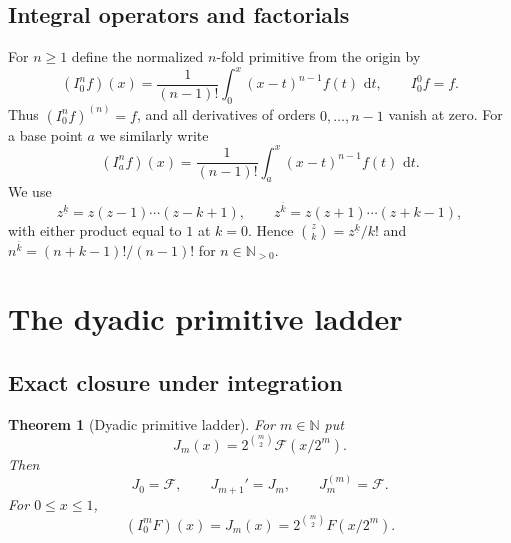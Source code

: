 \documentclass[11pt,oneside]{article}
\numberwithin{equation}{section}
\newtheorem{theorem}{Theorem}[section]
\theoremstyle{definition}
\theoremstyle{remark}
\newcommand{\N}{\mathbb N}
\newcommand{\dd}{\,\mathrm d}
\newcommand{\fall}[2]{#1^{\underline{#2}}}
\newcommand{\rise}[2]{#1^{\overline{#2}}}
\begin{document}
\subsection{Integral operators and factorials}

For $n\ge1$ define the normalized $n$-fold primitive from the origin by
\begin{equation}
 (I_0^nf)(x)=\frac1{(n-1)!}\int_0^x(x-t)^{n-1}f(t)\,\dd t,
 \qquad I_0^0f=f.                                             \label{eq:I0n}
\end{equation}
Thus $(I_0^nf)^{(n)}=f$, and all derivatives of orders $0,\ldots,n-1$ vanish at zero.
For a base point $a$ we similarly write
\begin{equation}
 (I_a^nf)(x)=\frac1{(n-1)!}\int_a^x(x-t)^{n-1}f(t)\,\dd t.
 \label{eq:Ian}
\end{equation}
We use
\begin{equation}
 \fall zk=z(z-1)\cdots(z-k+1),\qquad
 \rise zk=z(z+1)\cdots(z+k-1),                               \label{eq:factorials}
\end{equation}
with either product equal to $1$ at $k=0$.  Hence
$\binom zk=\fall zk/k!$ and $\rise nk=(n+k-1)!/(n-1)!$ for $n\in\N_{>0}$.

\section{The dyadic primitive ladder}
\label{sec:ladder}

\subsection{Exact closure under integration}

\begin{theorem}[Dyadic primitive ladder]
\label{thm:ladder}
For $m\in\N$ put
\begin{equation}
 J_m(x)=2^{\binom m2}\mathcal F(x/2^m).                       \label{eq:Jm}
\end{equation}
Then
\begin{equation}
 J_0=\mathcal F,\qquad J_{m+1}'=J_m,\qquad J_m^{(m)}=\mathcal F.
 \label{eq:J-ladder}
\end{equation}
For $0\le x\le1$,
\begin{equation}
 (I_0^mF)(x)=J_m(x)=2^{\binom m2}F(x/2^m).                    \label{eq:F-nprimitive}
\end{equation}
\end{theorem}
\end{document}
